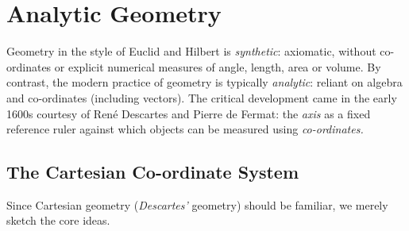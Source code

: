\graphicspath{{3analytic/asy/}}

\section{Analytic Geometry}

Geometry in the style of Euclid and Hilbert is \emph{synthetic}: axiomatic, without co-ordinates or explicit numerical measures of angle, length, area or volume. By contrast, the modern practice of geometry is typically \emph{analytic}: reliant on algebra and co-ordinates (including vectors). The critical development came in the early 1600s courtesy of René Descartes and Pierre de Fermat: the \emph{axis} as a fixed reference ruler against which objects can be measured using \emph{co-ordinates.}

\subsection{The Cartesian Co-ordinate System}

Since Cartesian geometry (\emph{Descartes'} geometry) should be familiar, we merely sketch the core ideas.

